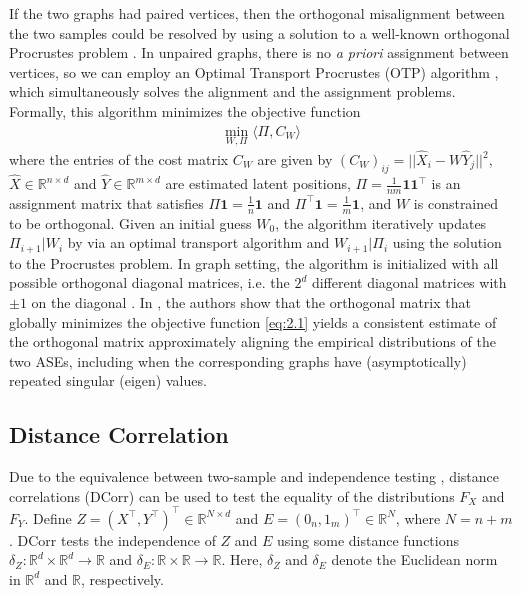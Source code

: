 If the two graphs had paired vertices, then the orthogonal misalignment between the two samples could be resolved by using a solution to
a well-known orthogonal Procrustes problem \cite{schonemann1966generalized}.
In unpaired graphs, there is no \textit{a priori} assignment between vertices, so we can employ an Optimal Transport Procrustes (OTP) algorithm \cite{agterberg2020nonparametric}, which simultaneously solves the alignment and the assignment problems. Formally, this algorithm minimizes the objective function
\begin{align}
    \min_{W,  \Pi} \langle \Pi, C_W \rangle
    \label{eq:2.1}
\end{align}
where the entries of the cost matrix $C_W$ are given by $\left(C_W\right)_{ij} =  ||\hat X_i - W\hat Y_j||^2$,  $\hat X \in \mathbb{R}^{n\times d}$ and $\hat Y \in \mathbb{R}^{m\times d}$ are estimated latent positions,  $\Pi = \frac{1}{nm} \mathbf{1} \mathbf{1}^\top$ is an assignment matrix that satisfies $\Pi \mathbf{1} = \frac{1}{n} \mathbf{1}$ and $\Pi^{\top} \mathbf{1} = \frac{1}{m} \mathbf{1}$, and $W$ is constrained to be orthogonal. Given an initial guess $W_0$, the algorithm iteratively updates $\Pi_{i+1} | W_{i}$
by via an optimal transport algorithm \cite{alvarez2019towards} and $W_{i+1} | \Pi_{i}$ using the solution to the Procrustes problem. In graph setting, the algorithm is initialized with all possible orthogonal diagonal matrices, i.e. the 
$2^d$ different diagonal matrices with $\pm{1}$ on the diagonal \cite{agterberg2020nonparametric}. In \cite{agterberg2020nonparametric}, the authors show that the orthogonal matrix that globally minimizes the objective function \eqref{eq:2.1} yields a consistent estimate of the orthogonal matrix approximately aligning the empirical distributions of the two ASEs, including when the corresponding graphs have (asymptotically) repeated singular (eigen) values.

\subsection{Distance Correlation}
Due to the equivalence between two-sample and independence testing \cite{exact-equivalence-2}, distance correlations (DCorr) can be used to test the equality of the distributions $F_X$ and $F_Y$. Define $Z=(X^\top, Y^\top)^\top\in\mathbb{R}^{N\times d}$ and $E=(0_n, 1_m)^\top\in\mathbb{R}^{N}$, where $N=n+m$. DCorr tests the independence of $Z$ and $E$ using some distance functions $\delta_Z:\mathbb{R}^{d}\times\mathbb{R}^{d}\rightarrow\mathbb{R}$ and $\delta_E:\mathbb{R}\times\mathbb{R}\rightarrow\mathbb{R}$. Here, $\delta_Z$ and $\delta_E$ denote the Euclidean norm in $\mathbb{R}^{d}$ and $\mathbb{R}$, respectively.

